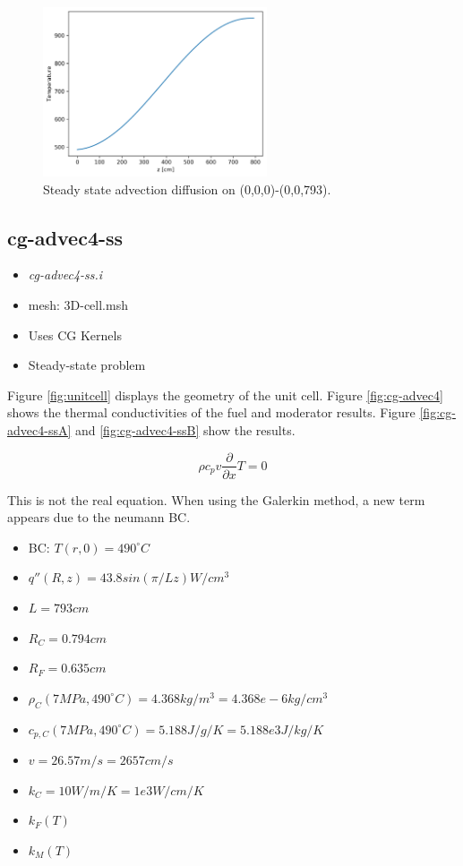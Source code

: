\documentclass[11pt,letterpaper]{article}
\begin{document}
	\begin{figure}[htbp!]
		\centering
		\includegraphics[height=5cm]{cg-advec3-ssA}
		\caption{Steady state advection diffusion on (0,0,0)-(0,0,793).}
		\label{fig:cg-advec3-ss}
	\end{figure}

	\subsection{cg-advec4-ss}

	\begin{itemize}
		\item \textit{cg-advec4-ss.i}
		\item mesh: 3D-cell.msh
		\item Uses CG Kernels
		\item Steady-state problem
	\end{itemize}

    Figure \ref{fig:unitcell} displays the geometry of the unit cell.
    Figure \ref{fig:cg-advec4} shows the thermal conductivities of the fuel and moderator results.
    Figure \ref{fig:cg-advec4-ssA} and \ref{fig:cg-advec4-ssB} show the results.

	\begin{equation}
    \rho c_p v \frac{\partial}{\partial x} T = 0
	\end{equation}

	This is not the real equation. When using the Galerkin method, a new term appears due to the neumann BC.

	\begin{itemize}
		\item BC: $T(r, 0) = 490^{\circ}C$
		\item $q''(R, z) = 43.8 sin (\pi/L z) W/cm^3$
		\item $L = 793 cm$
		\item $R_C = 0.794 cm$
		\item $R_F = 0.635 cm$
		\item $\rho_C (7 MPa, 490^{\circ}C) = 4.368 kg/m^3 = 4.368e-6 kg/cm^3$
		\item $c_{p,C} (7 MPa, 490^{\circ}C) = 5.188 J/g/K = 5.188e3 J/kg/K$
		\item $v = 26.57 m/s = 2657 cm/s$
		\item $k_C = 10 W/m/K = 1e3 W/cm/K$
		\item $k_F(T)$
		\item $k_M(T)$
	\end{itemize}
\end{document}
